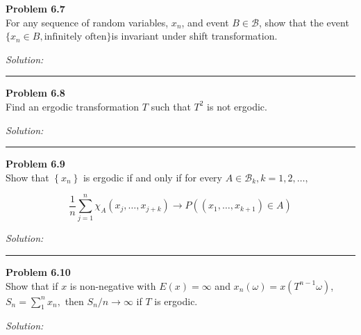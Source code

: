 \documentclass[a4paper, 11pt]{article}
\newenvironment{problem}[2][Problem]
    { \begin{mdframed}[backgroundcolor=gray!20] \textbf{#1 #2} \\}
    {  \end{mdframed}}
\newenvironment{solution}
    {\textit{Solution:}}
    {}
\begin{document}
\begin{problem}{6.7}
For any sequence of random variables, $x_n$, and event $B\in \mathcal{B}$, show that the event $\{x_n \in B, \text{infinitely often}\}$is invariant under shift transformation.


\end{problem}
\begin{solution}


\end{solution} 
%
\noindent\rule{7in}{2.8pt}

\begin{problem}{6.8}
 Find an ergodic transformation $T$ such that $T^{2}$ is not ergodic.
\end{problem}
\begin{solution}


\end{solution} 

\noindent\rule{7in}{2.8pt}

\begin{problem}{6.9}
Show that $\left\{x_{n}\right\}$ is ergodic if and only if for every $A \in \mathcal{B}_{k}, k=1,2, \ldots,$

$$\frac{1}{n} \sum_{j=1}^{n} \chi_{A}\left(x_{j}, \ldots, x_{j+k}\right) \rightarrow P\left(\left(x_{1}, \ldots, x_{k+1}\right) \in A\right)$$
\end{problem}
\begin{solution}


\end{solution} 

\noindent\rule{7in}{2.8pt}

\begin{problem}{6.10}
 Show that if $x$ is non-negative with $E(x)=\infty$ and $x_{n}(\omega)=x\left(T^{n-1} \omega\right)$,
$S_{n}=\sum_{1}^{n} x_{n},$ then $S_{n} / n \rightarrow \infty$ if $T$ is ergodic.
\end{problem}
\begin{solution}


\end{solution} 
\end{document}
